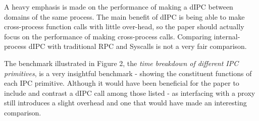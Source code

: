 \documentclass{article}
\begin{document}
A heavy emphasis is made on the performance of making a dIPC between domains of the same process. The main benefit of dIPC is being able to make cross-process function calls with little over-head, so the paper should actually focus on the performance of making cross-process calls. Comparing internal-process dIPC with traditional RPC and Syscalls is not a very fair comparison.

The benchmark illustrated in Figure 2, the \textit{time breakdown of different IPC primitives}, is a very insightful benchmark - showing the constituent functions of each IPC primitive. Although it would have been beneficial for the paper to include and contrast a dIPC call among those listed - as interfacing with a proxy still introduces a slight overhead and one that would have made an interesting comparison. 


\nocite{*}


\end{document}
